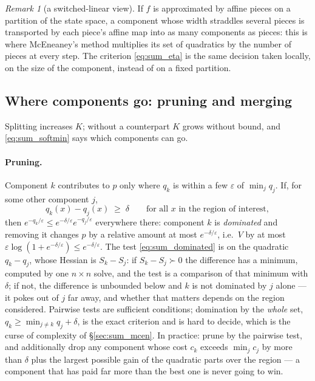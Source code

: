 \documentclass[11pt,a4paper]{article}
\newcommand{\eps}{\varepsilon}
\theoremstyle{plain}
\theoremstyle{definition}
\theoremstyle{remark}
\newtheorem{remark}{Remark}
\begin{document}
\begin{remark}[a switched-linear view]
If $f$ is approximated by affine pieces on a partition of the state space, a component whose width straddles several pieces is transported by each piece's affine map into as many components as pieces: this is where McEneaney's method multiplies its set of quadratics by the number of pieces at every step. The criterion \eqref{eq:sum_eta} is the same decision taken locally, on the size of the component, instead of on a fixed partition.
\end{remark}

\subsection{Where components go: pruning and merging}
\label{sec:sum_prune}

Splitting increases $K$; without a counterpart $K$ grows without bound, and \eqref{eq:sum_softmin} says which components can go.

\paragraph{Pruning.}
Component $k$ contributes to $p$ only where $q_k$ is within a few $\eps$ of $\min_jq_j$. If, for some other component $j$,
\begin{equation}
  q_k(x) - q_j(x) \;\ge\; \delta \qquad\text{for all } x \text{ in the region of interest},
  \label{eq:sum_dominated}
\end{equation}
then $e^{-q_k/\eps}\le e^{-\delta/\eps}e^{-q_j/\eps}$ everywhere there: component $k$ is \emph{dominated} and removing it changes $p$ by a relative amount at most $e^{-\delta/\eps}$, i.e.\ $V$ by at most $\eps\log(1+e^{-\delta/\eps})\le e^{-\delta/\eps}$. The test \eqref{eq:sum_dominated} is on the quadratic $q_k-q_j$, whose Hessian is $S_k-S_j$: if $S_k-S_j\succ0$ the difference has a minimum, computed by one $n\times n$ solve, and the test is a comparison of that minimum with $\delta$; if not, the difference is unbounded below and $k$ is not dominated by $j$ alone --- it pokes out of $j$ far away, and whether that matters depends on the region considered. Pairwise tests are sufficient conditions; domination by the \emph{whole} set, $q_k\ge\min_{j\ne k}q_j+\delta$, is the exact criterion and is hard to decide, which is the curse of complexity of \S\ref{sec:sum_mcen}. In practice: prune by the pairwise test, and additionally drop any component whose cost $c_k$ exceeds $\min_jc_j$ by more than $\delta$ plus the largest possible gain of the quadratic parts over the region --- a component that has paid far more than the best one is never going to win.
\end{document}
